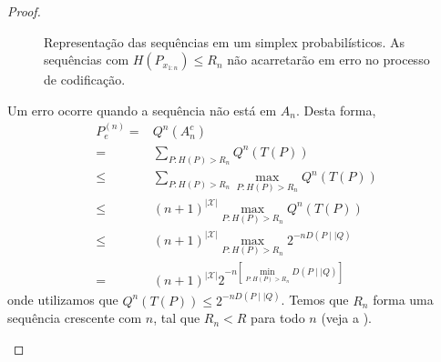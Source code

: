 \begin{proof}
\begin{figure}
{
  }
  \caption{Representação das sequências em um simplex probabilísticos. As sequências com $H(P_{x_{1:n}}) \leq  R_n$ não acarretarão em erro no processo de codificação.}
  \label{fig:type-simplex}
\end{figure}
Um erro ocorre quando a sequência não está em $A_n$. Desta forma,
\begin{subequations}
  \begin{align}
    P_e^{(n)} ={}& Q^n(A^c_n) \\
        ={}& \sum_{P: H(P) > R_n} Q^n (T(P)) \\
        \leq{}& \sum_{P: H(P) > R_n} \max_{P: H(P) > R_n} Q^n (T(P)) \\
        \leq{}& (n+1)^{\vert \mathcal{X} \vert} \max_{P: H(P) > R_n} Q^n (T(P)) \\
        \leq{}& (n+1)^{\vert \mathcal{X} \vert} \max_{P: H(P) > R_n} 2^{-n  D(P \mid\mid Q)} \\
        ={}& (n+1)^{\vert \mathcal{X} \vert} 2^{-n [\min_{P: H(P) > R_n} D(P \mid\mid Q)]} \label{eq:dempeteoshan}
  \end{align}
\end{subequations}
onde utilizamos que $Q^n(T(P)) \leq 2^{-n D(P\mid \mid Q)}$.
Temos que $R_n$ forma uma sequência crescente com $n$, tal que $R_n < R$ para todo $n$ (veja a ).
\begin{marginfigure}%
  \resizebox{1.2\textwidth}{!}{
    \begin{tikzpicture}


\end{tikzpicture}}
\end{marginfigure}
\end{proof}
